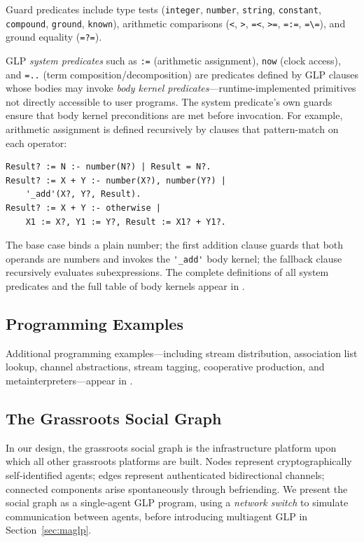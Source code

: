 Guard predicates include type tests (\verb|integer|, \verb|number|, \verb|string|, \verb|constant|, \verb|compound|, \verb|ground|, \verb|known|), arithmetic comparisons (\verb|<|, \verb|>|, \verb|=<|, \verb|>=|, \verb|=:=|, \verb|=\=|), and ground equality (\verb|=?=|).

GLP \emph{system predicates} such as \verb|:=| (arithmetic assignment), \verb|now| (clock access), and \verb|=..| (term composition/decomposition) are predicates defined by GLP clauses whose bodies may invoke \emph{body kernel predicates}---runtime-implemented primitives not directly accessible to user programs. The system predicate's own guards ensure that body kernel preconditions are met before invocation. For example, arithmetic assignment is defined recursively by clauses that pattern-match on each operator:

\begin{verbatim}
Result? := N :- number(N?) | Result = N?.
Result? := X + Y :- number(X?), number(Y?) |
    '_add'(X?, Y?, Result).
Result? := X + Y :- otherwise |
    X1 := X?, Y1 := Y?, Result := X1? + Y1?.
\end{verbatim}
\noindent The base case binds a plain number; the first addition clause guards that both operands are numbers and invokes the \verb|'_add'| body kernel; the fallback clause recursively evaluates subexpressions. The complete definitions of all system predicates and the full table of body kernels appear in .

\subsection{Programming Examples}
\label{sec:examples}

Additional programming examples---including stream distribution, association list lookup, channel abstractions, stream tagging, cooperative production, and metainterpreters---appear in .

\subsection{The Grassroots Social Graph}
\label{sec:social-graph}
In our design,  the grassroots social graph is the infrastructure platform upon which all other grassroots platforms are built. Nodes represent cryptographically self-identified agents; edges represent authenticated bidirectional channels; connected components arise spontaneously through befriending. We present the social graph as a single-agent GLP program, using a \emph{network switch} to simulate communication between agents, before introducing multiagent GLP in Section~\ref{sec:maglp}.


